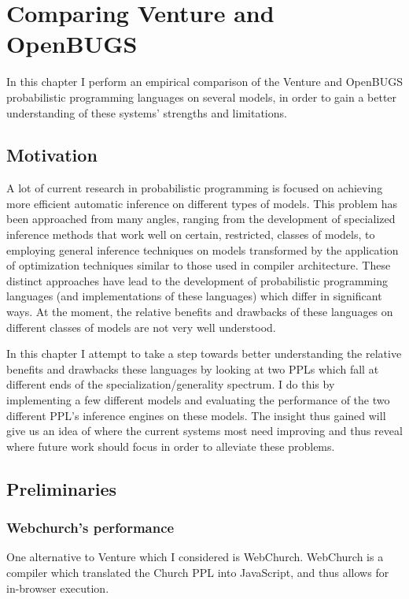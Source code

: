 \chapter{Comparing Venture and OpenBUGS}

In this chapter I perform an empirical comparison of the Venture and OpenBUGS probabilistic programming languages on several models, in order to gain a better understanding of these systems' strengths and limitations.

\section{Motivation}

A lot of current research in probabilistic programming is focused on achieving more efficient automatic inference on different types of models. This problem has been approached from many angles, ranging from the development of specialized inference methods that work well on certain, restricted, classes of models, to employing general inference techniques on models transformed by the application of optimization techniques similar to those used in compiler architecture. These distinct approaches have lead to the development of probabilistic programming languages (and implementations of these languages) which differ in significant ways.  At the moment, the relative benefits and drawbacks of these languages on different classes of models are not very well understood. 

In this chapter I attempt to take a step towards better understanding the relative benefits and drawbacks these languages by looking at two PPLs which fall at different ends of the specialization/generality spectrum. I do this by implementing a few different models and evaluating the performance of the two different PPL's inference engines on these models. The insight thus gained will give us an idea of where the current systems most need improving and thus reveal where future work should focus in order to alleviate these problems.

\section{Preliminaries}

\subsection{Webchurch's performance}
One alternative to Venture which I considered is WebChurch. WebChurch is a compiler which translated the Church PPL into JavaScript, and thus allows for in-browser execution.

